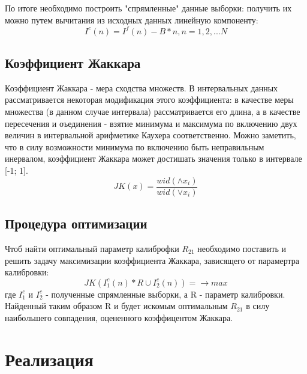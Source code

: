 \documentclass[a4paper,14pt]{article}
\begin{document}
	По итоге необходимо построить "спрямленные" данные выборки: получить их можно путем вычитания из исходных данных линейную компоненту:
	\begin{equation}
		I^c(n) = I^f(n) - B * n, n = 1, 2, ... N
	\end{equation}
	
	\subsection{Коэффициент Жаккара}
	Коэффициент Жаккара - мера сходства множеств. В интервальных данных рассматривается некоторая модификация этого коэффициента: в качестве меры множества (в данном случае интервала) рассматривается его длина, а в качестве пересечения и оъединения - взятие минимума и максимума по включению двух величин в интервальной арифметике Каухера соответственно. Можно заметить, что в силу возможности минимума по включению быть неправильным инервалом, коэффициент Жаккара может достишать значения только в интервале [-1; 1].
	\begin{equation}
		JK(x) = \frac{wid(\wedge x_i)}{wid(\vee x_i)}
	\end{equation}
	
	\subsection{Процедура оптимизации}
	Чтоб найти оптимальный параметр калиброфки $R_21$ необходимо поставить и решить задачу максимизации коэффициента Жаккара, зависящего от парамертра калибровки:
	\begin{equation}
		JK(I_1^c(n) * R \cup I_2^c(n)) =  \rightarrow max
	\end{equation}
	где $I_1^c$ и $I_2^c$ - полученные спрямленные выборки, а R - параметр калибровки. Найденный таким образом R и будет искомым оптимальным $R_{21}$ в силу наибольшего совпадения, оцененного коэффицентом Жаккара.
	\section{Реализация}
\end{document}
